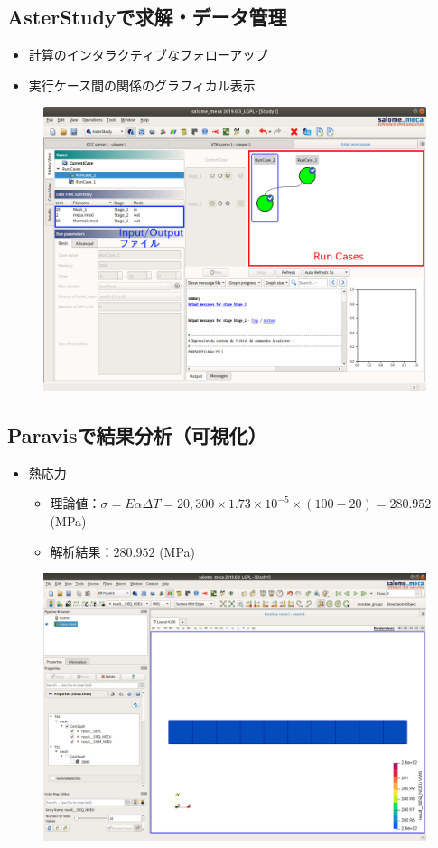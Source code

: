 \subsection{AsterStudyで求解・データ管理}
\begin{itemize}
	\item 計算のインタラクティブなフォローアップ
	\item 実行ケース間の関係のグラフィカル表示
\end{itemize}
\vspace{-\baselineskip}
\begin{figure}[H]
	\centering
	\includegraphics[width=0.75\columnwidth]{fig/runcase.png}
\end{figure}
\clearpage
\subsection{Paravisで結果分析（可視化）}
\begin{itemize}
	\item 熱応力
	      \begin{itemize}
		      \item 理論値：$\sigma=E\alpha\Delta T=20,300\times1.73\times 10^{-5}\times(100-20)=280.952$ (MPa)
		      \item 解析結果：$280.952$ (MPa)
	      \end{itemize}
\end{itemize}
\vspace{-\baselineskip}
\begin{figure}[H]
	\centering
	\includegraphics[width=0.75\columnwidth]{fig/vmis.png}
\end{figure}
